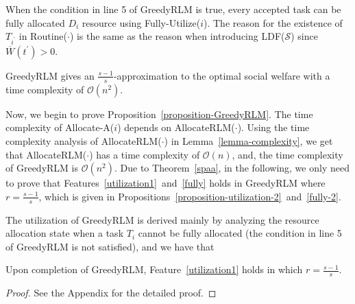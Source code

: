 \documentclass[10pt,journal,compsoc]{IEEEtran}
\begin{document}
When the condition in line 5 of GreedyRLM is true, every accepted task can be fully allocated $D_{i}$ resource using Fully-Utilize($i$). The reason for the existence of $T_{i^{\prime}}$ in Routine($\cdot$) is the same as the reason when introducing LDF($\mathcal{S}$) since $\overline{W}(t^{\prime})>0$.




\begin{proposition}\label{proposition-GreedyRLM}
GreedyRLM gives an $\frac{s-1}{s}$-approximation to the optimal social welfare with a time complexity of $\mathcal{O}(n^{2})$.
\end{proposition}






Now, we begin to prove Proposition~\ref{proposition-GreedyRLM}. The time complexity of Allocate-A($i$) depends on AllocateRLM($\cdot$). Using the time complexity analysis of AllocateRLM($\cdot$) in Lemma~\ref{lemma-complexity}, we get that AllocateRLM($\cdot$) has a time complexity of $\mathcal{O}(n)$, and, the time complexity of GreedyRLM is $\mathcal{O}(n^{2})$. Due to Theorem~\ref{spaa}, in the following, we only need to prove that Features~\ref{utilization1}~and~\ref{fully} holds in GreedyRLM where $r=\frac{s-1}{s}$, which is given in Propositions~\ref{proposition-utilization-2}~and~\ref{fully-2}.


The utilization of GreedyRLM is derived mainly by analyzing the resource allocation state when a task $T_{i}$ cannot be fully allocated (the condition in line 5 of GreedyRLM is not satisfied), and we have that
\begin{proposition}\label{proposition-utilization-2}
Upon completion of GreedyRLM, Feature~\ref{utilization1} holds in which $r=\frac{s-1}{s}$.
\end{proposition}\begin{proof}
See the Appendix for the detailed proof.
\end{proof}
\end{document}
